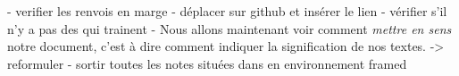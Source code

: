 - verifier les renvois en marge
- déplacer sur github et insérer le lien
- vérifier s'il n'y a pas des  qui trainent
- Nous allons maintenant voir comment \emph{mettre en sens} notre document, c'est à dire comment indiquer  la signification de nos textes. -> reformuler
- sortir toutes les notes situées dans en environnement framed